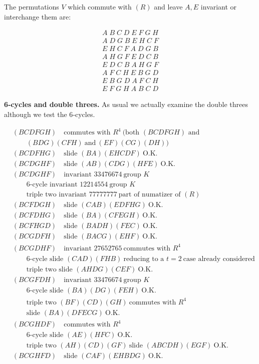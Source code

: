 \documentclass[12pt]{article}
\begin{document}
\smallskip

The permutations $V$ which commute with $(R)$ and leave $A, E$ invariant or interchange them are:

\[
\begin{aligned}
A\;B\;C\;D\;E\;F\;G\;H \\
A\;D\;G\;B\;E\;H\;C\;F \\
E\;H\;C\;F\;A\;D\;G\;B \\
A\;H\;G\;F\;E\;D\;C\;B \\
E\;D\;C\;B\;A\;H\;G\;F \\
A\;F\;C\;H\;E\;B\;G\;D \\
E\;B\;G\;D\;A\;F\;C\;H \\
E\;F\;G\;H\;A\;B\;C\;D
\end{aligned}
\]

\noindent
{\bf 6‐cycles and double threes.}  
As usual we actually examine the double threes although we test the 6‐cycles.

\[
\begin{aligned}
&(BCDFGH)\quad \text{commutes with }R^4\ (\text{both }(BCDFGH)\text{ and}\\
&\qquad (BDG)(CFH)\ \text{and}\ (EF)(CG)(DH))\\
&(BCDFHG)\quad \text{slide }(BA)(EHCDF)\ \text{O.K.}\\
&(BCDGHF)\quad \text{slide }(AB)(CDG)(HFE)\ \text{O.K.}\\
&(BCDGHF)\quad \text{invariant }33476674\ \text{group }K \\
&\qquad 6\text{-cycle invariant }12214554\ \text{group }K\\
&\qquad \text{triple two invariant }77777777\ \text{part of numatizer of }(R)\\
&(BCFDGH)\quad \text{slide }(CAB)(EDFHG)\ \text{O.K.}\\
&(BCFDHG)\quad \text{slide }(BA)(CFEGH)\ \text{O.K.}\\
&(BCFHGD)\quad \text{slide }(BADH)(FEC)\ \text{O.K.}\\
&(BCGDFH)\quad \text{slide }(BACG)(EHF)\ \text{O.K.}\\
&(BCGDHF)\quad \text{invariant }27652765\ \text{commutes with }R^4\\
&\qquad 6\text{-cycle slide }(CAD)(FHB)\ \text{reducing to a }t=2\ \text{case already considered}\\
&\qquad \text{triple two slide }(AHDG)(CEF)\ \text{O.K.}\\
&(BCGFDH)\quad \text{invariant }33476674\ \text{group }K\\
&\qquad 6\text{-cycle slide }(BA)(DG)(FEH)\ \text{O.K.}\\
&\qquad \text{triple two }(BF)(CD)(GH)\ \text{commutes with }R^4\\
&\qquad \text{slide }(BA)(DFECG)\ \text{O.K.}\\
&(BCGHDF)\quad \text{commutes with }R^4\\
&\qquad 6\text{-cycle slide }(AE)(HFC)\ \text{O.K.}\\
&\qquad \text{triple two }(AH)(CD)(GF)\ \text{slide }(ABCDH)(EGF)\ \text{O.K.}\\
&(BCGHFD)\quad \text{slide }(CAF)(EHBDG)\ \text{O.K.}
\end{aligned}
\]
\end{document}
